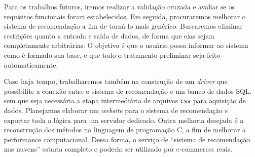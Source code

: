 
Para os trabalhos futuros, iremos realizar a validação cruzada e avaliar se os requisitos funcionais foram estabelecidos. Em seguida, procuraremos melhorar o sistema de recomendação a fim de torná-lo mais genérico. Buscaremos eliminar restrições quanto a entrada e saída de dados, de forma que elas sejam completamente arbitrárias. O objetivo é que o usuário possa informar ao sistema como é formado sua base, e que todo o tratamento preliminar seja feito automaticamente. 

Caso haja tempo, trabalharemos também na construção de um \textit{driver} que possibilite a conexão entre o sistema de recomendação e um banco de dados SQL, sem que seja necessária a etapa intermediária de arquivos \texttt{csv} para aquisição de dados. Planejamos elaborar um \textit{website} para o sistema de recomendação e exportar toda a lógica para um servidor dedicado. Outra melhoria desejada é a reconstrução dos métodos na linguagem de programação C, a fim de melhorar a performance computacional. Dessa forma, o serviço de ``sistema de recomendação nas nuvens'' estaria completo e poderia ser utilizado por e-commerces reais.